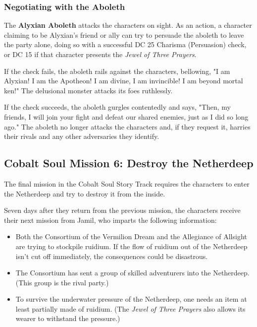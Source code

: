 \documentclass[letterpaper, 11pt, bg=full, twocolumn]{dndbook}
\begin{document}
\subsubsection{Negotiating with the Aboleth}

The \textbf{Alyxian Aboleth} attacks the characters on sight. As an action, a character claiming to be Alyxian's friend or ally can try to persuade the aboleth to leave the party alone, doing so with a successful DC 25 Charisma (Persuasion) check, or DC 15 if that character presents the \textit{Jewel of Three Prayers}.

If the check fails, the aboleth rails against the characters, bellowing, "I am Alyxian! I am the Apotheon! I am divine, I am invincible! I am beyond mortal ken!" The delusional monster attacks its foes ruthlessly.

If the check succeeds, the aboleth gurgles contentedly and says, "Then, my friends, I will join your fight and defeat our shared enemies, just as I did so long ago." The aboleth no longer attacks the characters and, if they request it, harries their rivals and any other adversaries they identify.

\subsection{Cobalt Soul Mission 6: Destroy the Netherdeep}

The final mission in the Cobalt Soul Story Track requires the characters to enter the Netherdeep and try to destroy it from the inside.

Seven days after they return from the previous mission, the characters receive their next mission from Jamil, who imparts the following information:

\begin{itemize}
\item Both the Consortium of the Vermilion Dream and the Allegiance of Allsight are trying to stockpile ruidium. If the flow of ruidium out of the Netherdeep isn't cut off immediately, the consequences could be disastrous.
\item The Consortium has sent a group of skilled adventurers into the Netherdeep. (This group is the rival party.)
\item To survive the underwater pressure of the Netherdeep, one needs an item at least partially made of ruidium. (The \textit{Jewel of Three Prayers} also allows its wearer to withstand the pressure.)
\end{itemize}
\end{document}

